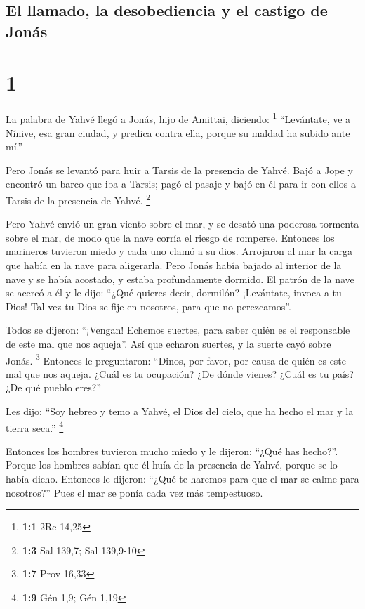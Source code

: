 \hypertarget{el-llamado-la-desobediencia-y-el-castigo-de-jonuxe1s}{%
\subsection{El llamado, la desobediencia y el castigo de
Jonás}\label{el-llamado-la-desobediencia-y-el-castigo-de-jonuxe1s}}

\hypertarget{section}{%
\section{1}\label{section}}

 La palabra de Yahvé llegó a Jonás, hijo de Amittai,
diciendo: \footnote{\textbf{1:1} 2Re 14,25}  ``Levántate,
ve a Nínive, esa gran ciudad, y predica contra ella, porque su maldad ha
subido ante mí.''

 Pero Jonás se levantó para huir a Tarsis de la presencia
de Yahvé. Bajó a Jope y encontró un barco que iba a Tarsis; pagó el
pasaje y bajó en él para ir con ellos a Tarsis de la presencia de Yahvé.
\footnote{\textbf{1:3} Sal 139,7; Sal 139,9-10}

 Pero Yahvé envió un gran viento sobre el mar, y se desató
una poderosa tormenta sobre el mar, de modo que la nave corría el riesgo
de romperse.  Entonces los marineros tuvieron miedo y cada
uno clamó a su dios. Arrojaron al mar la carga que había en la nave para
aligerarla. Pero Jonás había bajado al interior de la nave y se había
acostado, y estaba profundamente dormido.  El patrón de la
nave se acercó a él y le dijo: ``¿Qué quieres decir, dormilón?
¡Levántate, invoca a tu Dios! Tal vez tu Dios se fije en nosotros, para
que no perezcamos''.

 Todos se dijeron: ``¡Vengan! Echemos suertes, para saber
quién es el responsable de este mal que nos aqueja''. Así que echaron
suertes, y la suerte cayó sobre Jonás. \footnote{\textbf{1:7} Prov 16,33}
 Entonces le preguntaron: ``Dinos, por favor, por causa de
quién es este mal que nos aqueja. ¿Cuál es tu ocupación? ¿De dónde
vienes? ¿Cuál es tu país? ¿De qué pueblo eres?''

 Les dijo: ``Soy hebreo y temo a Yahvé, el Dios del cielo,
que ha hecho el mar y la tierra seca.'' \footnote{\textbf{1:9} Gén 1,9;
  Gén 1,19}

 Entonces los hombres tuvieron mucho miedo y le dijeron:
``¿Qué has hecho?''. Porque los hombres sabían que él huía de la
presencia de Yahvé, porque se lo había dicho.  Entonces
le dijeron: ``¿Qué te haremos para que el mar se calme para nosotros?''
Pues el mar se ponía cada vez más tempestuoso.

